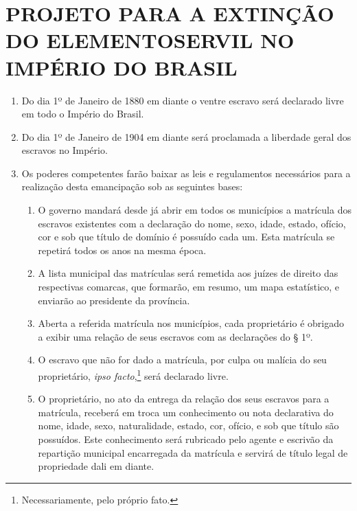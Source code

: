 \section*{PROJETO PARA A EXTINÇÃO DO ELEMENTO\break SERVIL NO IMPÉRIO DO BRASIL}

\begin{enumerate}[label=Art. \arabic*º]
\item Do dia 1º de Janeiro de 1880 em diante o ventre escravo será
declarado livre em todo o Império do Brasil.

\item Do dia 1º de Janeiro de 1904 em diante será proclamada a
liberdade geral dos escravos no Império.

\item Os poderes competentes farão baixar as leis e regulamentos
necessários para a realização desta emancipação sob as seguintes
bases:

\begin{enumerate}[label=§ \arabic*º]
\item O governo mandará desde já abrir em todos os municípios a
matrícula dos escravos existentes com a declaração do nome, sexo, idade,
estado, ofício, cor e sob que título de domínio é possuído cada um. Esta
matrícula se repetirá todos os anos na mesma época.

\item A lista municipal das matrículas será remetida aos juízes de
direito das respectivas comarcas, que formarão, em resumo, um mapa
estatístico, e enviarão ao presidente da província.

\item Aberta a referida matrícula nos municípios, cada proprietário é
obrigado a exibir uma relação de seus escravos com as declarações do § 1º.

\item O escravo que não for dado a matrícula, por culpa ou malícia do
seu proprietário, \emph{ipso facto},\footnote{Necessariamente, pelo
  próprio fato.} será declarado livre.

\item O proprietário, no ato da entrega da relação dos seus escravos
para a matrícula, receberá em troca um conhecimento ou nota declarativa
do nome, idade, sexo, naturalidade, estado, cor, ofício, e sob que
título são possuídos. Este conhecimento será rubricado pelo agente e
escrivão da repartição municipal encarregada da matrícula e servirá de
título legal de propriedade dali em diante.
\end{enumerate}


\end{enumerate}
